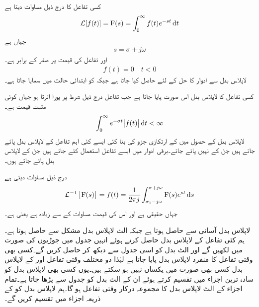 
کسی تفاعل  کا  درج ذیل مساوات دیتا ہے
\begin{align}
\Laplace[f(t)]=\bF(s)=\int_0^{\infty} f(t) e^{-st}\dif t
\end{align}
جہاں   ہے
\begin{align}
s=\sigma+j\omega
\end{align}
اور تفاعل  کی قیمت  پر صفر کے برابر ہے۔
\begin{align}
f(t)=0\quad t<0
\end{align}
لاپلاس بدل سے ادوار کا حل  کے لئے حاصل کیا جاتا ہے جبکہ  کو ابتدائی حالت میں سمایا جاتا ہے۔  

کسی تفاعل کا لاپلاس بدل اس صورت پایا جاتا ہے جب تفاعل درج ذیل شرط پر پورا اترتا ہو جہاں  کوئی مثبت قیمت ہے۔
\begin{align}\label{مساوات_لاپلاس_شرط_بدل_پایا_جاتا_ہے}
\int_0^{\infty} e^{-\sigma t}\abs{f(t)}\dif t<\infty
\end{align}
لاپلاس بدل کے حصول میں  کے ارتکازی جزو  کی بنا کئی ایسے کئی اہم تفاعل کے لاپلاس بدل پائے جاتے ہیں جن کے  نہیں پائے جاتے۔برقی ادوار میں ایسے تفاعل استعمال کئے جاتے ہیں جن کے لاپلاس بدل پائے جاتے ہوں۔

 درج ذیل مساوات دیتی ہے
\begin{align}
\Laplace^{-1}\left[\bF(s)\right]=f(t)=\frac{1}{2\pi j}\int_{\sigma_1-j\omega}^{\sigma+j\omega} \bF(s) e^{st} \dif s
\end{align}
 جہاں  حقیقی ہے اور اس کی قیمت مساوات  کے  سے زیادہ ہے یعنی  ہے۔

لاپلاس بدل آسانی سے حاصل ہوتا ہے جبکہ الٹ لاپلاس بدل مشکل سے حاصل ہوتا ہے۔ہم کئی تفاعل کے لاپلاس بدل حاصل کرتے ہوئے انہیں جدول میں جوڑیوں کی صورت میں لکھیں گے اور الٹ بدل کو اسی جدول سے دیکھ کر حاصل کریں گے۔کسی بھی وقتی تفاعل  کا منفرد لاپلاس بدل  پایا جاتا ہے لہٰذا دو مختلف وقتی تفاعل  اور  کے لاپلاس بدل کسی بھی صورت میں یکساں نہیں ہو سکتے ہیں۔یوں کسی بھی لاپلاس بدل  کو سادہ ترین اجزاء میں تقسیم کرتے ہوئے ان کے الٹ بدل کو جدول سے پڑھا جاتا ہے۔تمام اجزاء کے الٹ لاپلاس بدل کا مجموعہ درکار وقتی تفاعل ہو گا۔ہم لاپلاس بدل کو  کے ذریعہ اجزاء میں تقسیم کریں گے۔

